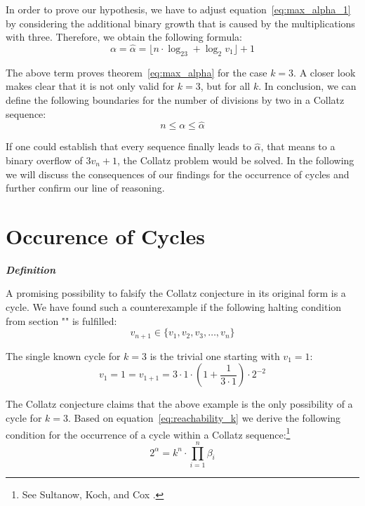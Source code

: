 \documentclass{SciPress_2015}
\renewcommand{\subsection}[1]{\textit{\textbf{#1}}}
\begin{document}
\par\medskip
In order to prove our hypothesis, we have to adjust equation~\ref{eq:max_alpha_1} by considering the additional binary growth that is caused by the multiplications with three. Therefore, we obtain the following formula:
\begin{equation}
\label{eq:max_alpha_k}
	\alpha=\hat\alpha=\lfloor n\cdot\log_23+\log_2v_1\rfloor+1
\end{equation}

The above term proves theorem~\ref{eq:max_alpha} for the case $k=3$. A closer look makes clear that it is not only valid for $k=3$, but for all $k$. In conclusion, we can define the following boundaries for the number of divisions by two in a Collatz sequence:
\begin{equation}
n\le\alpha\le\hat\alpha
\end{equation}

If one could establish that every sequence finally leads to $\hat\alpha$, that means to a binary overflow of $3v_n+1$, the Collatz problem would be solved. In the following we will discuss the consequences of our findings for the occurrence of cycles and further confirm our line of reasoning.

\section{Occurence of Cycles}
\subsection{Definition}
\par\noindent
A promising possibility to falsify the Collatz conjecture in its original form is a cycle. We have found such a counterexample if the following halting condition from section "" is fulfilled:
\[
v_{n+1}\in\{v_1,v_2,v_3,\ldots,v_n\}
\]
\par\noindent
The single known cycle for $k=3$ is the trivial one starting with $v_1=1$:
\[
	v_1=1=v_{1+1}=3\cdot1\cdot\left(1+\frac{1}{3\cdot1}\right)\cdot2^{-2}
\]

The Collatz conjecture claims that the above example is the only possibility of a cycle for $k=3$. Based on equation~\ref{eq:reachability_k} we derive the following condition for the occurrence of a cycle within a Collatz sequence:\footnote{See Sultanow, Koch, and Cox \cite[p.~11]{Ref_Sultanow_Koch_Cox_2020}.}
\begin{equation}
\label{eq:cycle}
    2^{\alpha}=k^n\cdot\prod_{i=1}^{n}\beta_i
\end{equation}
\end{document}
